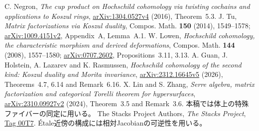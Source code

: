 C. Negron, \emph{The cup product on Hochschild cohomology via twisting cochains and applications to Koszul rings},
\href{https://arxiv.org/abs/1304.0527v4}{arXiv:1304.0527v4} (2016), Theorem~5.3.
J. Tu, \emph{Matrix factorizations via Koszul duality},
Compos. Math. \textbf{150} (2014), 1549--1578;
\href{https://arxiv.org/abs/1009.4151v2}{arXiv:1009.4151v2}, Appendix~A, Lemma~A.1.
W. Lowen, \emph{Hochschild cohomology, the characteristic morphism and derived deformations},
Compos. Math. \textbf{144} (2008), 1557--1580;
\href{https://arxiv.org/abs/0707.2602}{arXiv:0707.2602}, Propositions~3.11, 3.13.
A. Guan, J. Holstein, A. Lazarev and K. Rasmussen,
\emph{Hochschild cohomology of the second kind: Koszul duality and Morita invariance},
\href{https://arxiv.org/abs/2312.16645v5}{arXiv:2312.16645v5} (2026),
Theorems~4.7, 6.14 and Remark~6.16.
X. Lin and S. Zhang, \emph{Serre algebra, matrix factorization and categorical Torelli theorem for hypersurfaces},
\href{https://arxiv.org/abs/2310.09927v2}{arXiv:2310.09927v2} (2024),
Theorem~3.5 and Remark~3.6. 本稿では体上の特殊ファイバーの同定に用いる。
The Stacks Project Authors, \emph{The Stacks Project},
\href{https://stacks.math.columbia.edu/tag/00T7}{Tag 00T7}.
\'Etale近傍の構成には相対Jacobianの可逆性を用いる。
